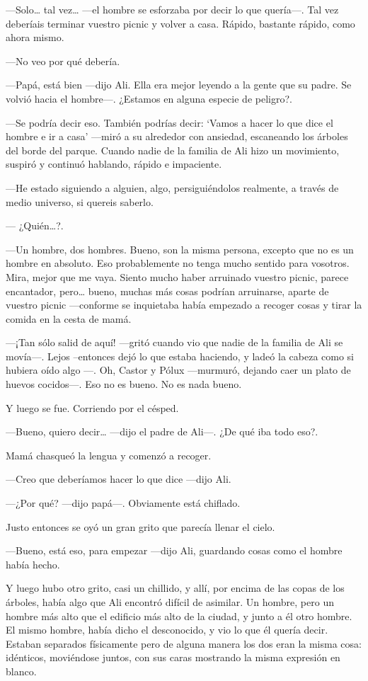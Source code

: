 ---Solo\ldots{} tal vez\ldots{} ---el hombre se esforzaba por decir lo
que quería---. Tal vez deberíais terminar vuestro picnic y volver a
casa. Rápido, bastante rápido, como ahora mismo.

---No veo por qué debería.

---Papá, está bien ---dijo Ali. Ella era mejor leyendo a la gente que su
padre. Se volvió hacia el hombre---. ¿Estamos en alguna especie de
peligro?.

---Se podría decir eso. También podrías decir: `Vamos a hacer lo que
dice el hombre e ir a casa' ---miró a su alrededor con ansiedad,
escaneando los árboles del borde del parque. Cuando nadie de la familia
de Ali hizo un movimiento, suspiró y continuó hablando, rápido e
impaciente.

---He estado siguiendo a alguien, algo, persiguiéndolos realmente, a
través de medio universo, si quereis saberlo.

--- ¿Quién\ldots{}?.

---Un hombre, dos hombres. Bueno, son la misma persona, excepto que no
es un hombre en absoluto. Eso probablemente no tenga mucho sentido para
vosotros. Mira, mejor que me vaya. Siento mucho haber arruinado vuestro
picnic, parece encantador, pero\ldots{} bueno, muchas más cosas podrían
arruinarse, aparte de vuestro picnic ---conforme se inquietaba había
empezado a recoger cosas y tirar la comida en la cesta de mamá.

---¡Tan sólo salid de aquí! ---gritó cuando vio que nadie de la familia
de Ali se movía---. Lejos --entonces dejó lo que estaba haciendo, y
ladeó la cabeza como si hubiera oído algo ---. Oh, Castor y Pólux
---murmuró, dejando caer un plato de huevos cocidos---. Eso no es bueno.
No es nada bueno.

Y luego se fue. Corriendo por el césped.

---Bueno, quiero decir\ldots{} ---dijo el padre de Ali---. ¿De qué iba
todo eso?.

Mamá chasqueó la lengua y comenzó a recoger.

---Creo que deberíamos hacer lo que dice ---dijo Ali.

---¿Por qué? ---dijo papá---. Obviamente está chiflado.

Justo entonces se oyó un gran grito que parecía llenar el cielo.

---Bueno, está eso, para empezar ---dijo Ali, guardando cosas como el
hombre había hecho.

Y luego hubo otro grito, casi un chillido, y allí, por encima de las
copas de los árboles, había algo que Ali encontró difícil de asimilar.
Un hombre, pero un hombre más alto que el edificio más alto de la
ciudad, y junto a él otro hombre. El mismo hombre, había dicho el
desconocido, y vio lo que él quería decir. Estaban separados físicamente
pero de alguna manera los dos eran la misma cosa: idénticos, moviéndose
juntos, con sus caras mostrando la misma expresión en blanco.

